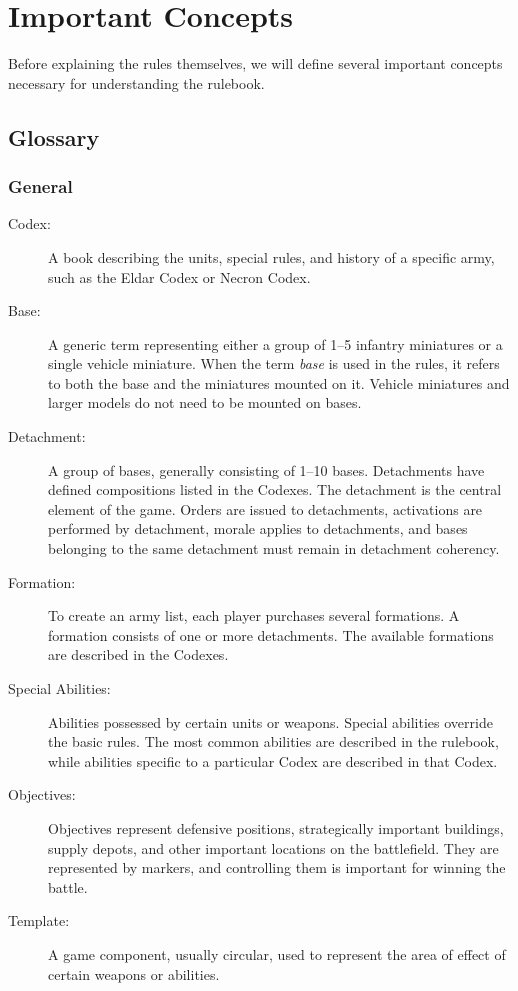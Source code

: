 \section{Important Concepts}

Before explaining the rules themselves, we will define several important concepts necessary for understanding the rulebook.

\subsection{Glossary}

\subsubsection{General}

\begin{description}
    \item[Codex:] A book describing the units, special rules, and history of a specific army, such as the Eldar Codex or Necron Codex.

    \item[Base:] A generic term representing either a group of 1--5 infantry miniatures or a single vehicle miniature. When the term \textit{base} is used in the rules, it refers to both the base and the miniatures mounted on it. Vehicle miniatures and larger models do not need to be mounted on bases.

    \item[Detachment:] A group of bases, generally consisting of 1--10 bases. Detachments have defined compositions listed in the Codexes. The detachment is the central element of the game. Orders are issued to detachments, activations are performed by detachment, morale applies to detachments, and bases belonging to the same detachment must remain in detachment coherency.

    \item[Formation:] To create an army list, each player purchases several formations. A formation consists of one or more detachments. The available formations are described in the Codexes.

    \item[Special Abilities:] Abilities possessed by certain units or weapons. Special abilities override the basic rules. The most common abilities are described in the rulebook, while abilities specific to a particular Codex are described in that Codex.

    \item[Objectives:] Objectives represent defensive positions, strategically important buildings, supply depots, and other important locations on the battlefield. They are represented by markers, and controlling them is important for winning the battle.

    \item[Template:] A game component, usually circular, used to represent the area of effect of certain weapons or abilities.
\end{description}

